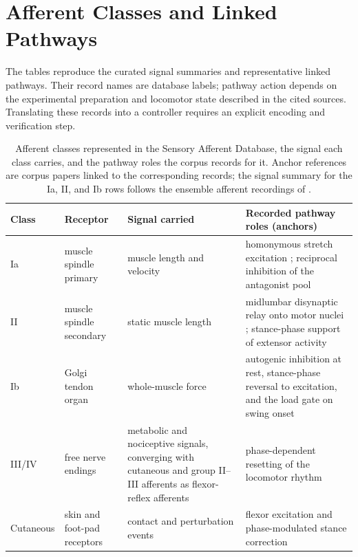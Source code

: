 \section{Afferent Classes and Linked Pathways}

The tables reproduce the curated signal summaries and representative linked pathways. Their record names are database labels; pathway action depends on the experimental preparation and locomotor state described in the cited sources. Translating these records into a controller requires an explicit encoding and verification step.

\begin{table}[htbp]
\caption{Afferent classes represented in the Sensory Afferent Database, the signal each class carries, and the pathway roles the corpus records for it. Anchor references are corpus papers linked to the corresponding records; the signal summary for the Ia, II, and Ib rows follows the ensemble afferent recordings of \citet{prochazka_ensemble_1998}.}
\label{tab:sadb_afferents}
\small
\begin{tabularx}{\textwidth}{@{}>{\raggedright\arraybackslash}p{}>{\raggedright\arraybackslash}p{}>{\raggedright\arraybackslash}p{}>{\raggedright\arraybackslash}X@{}}
\toprule
\textbf{Class} & \textbf{Receptor} & \textbf{Signal carried} & \textbf{Recorded pathway roles (anchors)} \\
\midrule
Ia & muscle spindle primary & muscle length and velocity & homonymous stretch excitation \citep{eccles_integrative_1958}; reciprocal inhibition of the antagonist pool \citep{jankowska_effect_1967} \\
II & muscle spindle secondary & static muscle length & midlumbar disynaptic relay onto motor nuclei \citep{edgley_interneuronal_1987}; stance-phase support of extensor activity \citep{mazzaro_afferent_2006} \\
Ib & Golgi tendon organ & whole-muscle force & autogenic inhibition at rest, stance-phase reversal to excitation, and the load gate on swing onset \citep{dietz_significance_2000, dominguez_candidate_2020} \\
III/IV & free nerve endings & metabolic and nociceptive signals, converging with cutaneous and group II--III afferents as flexor-reflex afferents & phase-dependent resetting of the locomotor rhythm \citep{schomburg_flexor_1998} \\
Cutaneous & skin and foot-pad receptors & contact and perturbation events & flexor excitation and phase-modulated stance correction \citep{sherrington_flexion_1910, forssberg_stumbling_1979} \\
\bottomrule
\end{tabularx}
\end{table}

